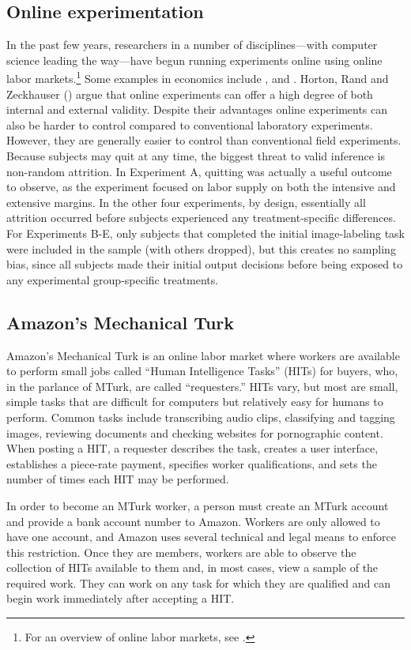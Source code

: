 \documentclass[12pt]{article}
\begin{document}
\subsection{Online experimentation}
In the past few years, researchers in a number of disciplines---with
computer science leading the way---have begun running experiments
online using online labor markets.\footnote{For an overview of online
  labor markets, see \cite{hortonOLM2010}.} Some examples in economics
include \cite{mason2009fip}, \cite{chandler2010} and
\cite{horton2010labor}. Horton, Rand and Zeckhauser
(\citeyear{hortonZeck2010}) argue that online experiments can offer a
high degree of both internal and external validity. Despite their
advantages online experiments can also be harder to control compared
to conventional laboratory experiments. However, they are generally
easier to control than conventional field experiments. Because
subjects may quit at any time, the biggest threat to valid inference
is non-random attrition. In Experiment A, quitting was actually a
useful outcome to observe, as the experiment focused on labor supply
on both the intensive and extensive margins. In the other four
experiments, by design, essentially all attrition occurred before
subjects experienced any treatment-specific differences. For
Experiments B-E, only subjects that completed the initial
image-labeling task were included in the sample (with others dropped),
but this creates no sampling bias, since all subjects made their
initial output decisions before being exposed to any experimental
group-specific treatments.

\subsection{Amazon's Mechanical Turk} 
Amazon's Mechanical Turk is an online labor market where workers are
available to perform small jobs called ``Human Intelligence Tasks''
(HITs) for buyers, who, in the parlance of MTurk, are called
``requesters.''  HITs vary, but most are small, simple tasks that are
difficult for computers but relatively easy for humans to
perform. Common tasks include transcribing audio clips, classifying
and tagging images, reviewing documents and checking websites for
pornographic content. When posting a HIT, a requester describes the
task, creates a user interface, establishes a piece-rate payment,
specifies worker qualifications, and sets the number of times each HIT
may be performed.

In order to become an MTurk worker, a person must create an MTurk
account and provide a bank account number to Amazon. Workers are only
allowed to have one account, and Amazon uses several technical and
legal means to enforce this restriction. Once they are members,
workers are able to observe the collection of HITs available to them
and, in most cases, view a sample of the required work.  They can work
on any task for which they are qualified and can begin work
immediately after accepting a HIT.
\end{document}
